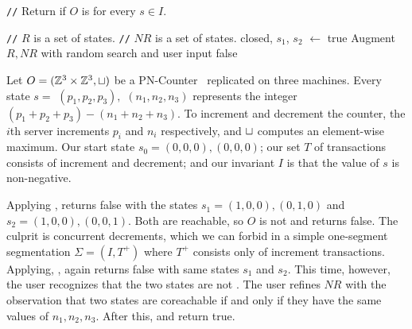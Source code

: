 \newcommand{\algocomment}[1]{\State \textcolor{flatdenim}{\texttt{//} #1}}
\begin{algorithm}[t]
  \caption{%
    Interactive \invariantconfluence{} decision procedure for arbitrary start
    state $s \in I$
  }%
  \begin{algorithmic}
    \algocomment{Return if $O$ is  for every $s \in I$.}
      \State \Return {}
    \EndFunction

    \State

    \algocomment{$R$ is a set of \TIcoreachable{} states.}
    \algocomment{$NR$ is a set of \TIcounreachable{} states.}
      \State closed, $s_1$, $s_2$ $\gets$ 
        \Return true
      \EndIf
      \State Augment $R, NR$ with random search and user input
        \Return false
      \EndIf
      \State \Return {}
    \EndFunction
  \end{algorithmic}
\end{algorithm}

\begin{example}
  Let $O = (\mathbb{Z}^3 \times \mathbb{Z}^3, \sqcup)$ be a
  PN-Counter~\cite{shapiro2011comprehensive} replicated on three machines.
  Every state $s = $ $(p_1, p_2, p_3),$ $(n_1, n_2, n_3)$ represents the
  integer $(p_1 + p_2 + p_3) - (n_1 + n_2 + n_3)$. To increment and decrement
  the counter, the $i$th server increments $p_i$ and $n_i$ respectively, and
  $\sqcup$ computes an element-wise maximum. Our start state $s_0 = (0, 0, 0),
  (0, 0, 0)$; our set $T$ of transactions consists of increment and decrement;
  and our invariant $I$ is that the value of $s$ is non-negative.

  Applying , \IsIclosed{} returns false
  with the states $s_1 = (1, 0, 0), (0, 1, 0)$ and $s_2 = (1, 0, 0), (0, 0,
  1)$. Both are reachable, so $O$ is not \sTIconfluent{} and
   returns false.  The culprit is
  concurrent decrements, which we can forbid in a simple one-segment
  segmentation $\Sigma = (I, T^+)$ where $T^+$ consists only of increment
  transactions. Applying, ,
  \IsIclosed{} again returns false with same states $s_1$ and $s_2$. This time,
  however, the user recognizes that the two states are not
  . The user refines $NR$ with the observation that two
  states are coreachable if and only if they have the same values of $n_1, n_2,
  n_3$. After this, \IsIclosed{} and
   return true.
\end{example}

